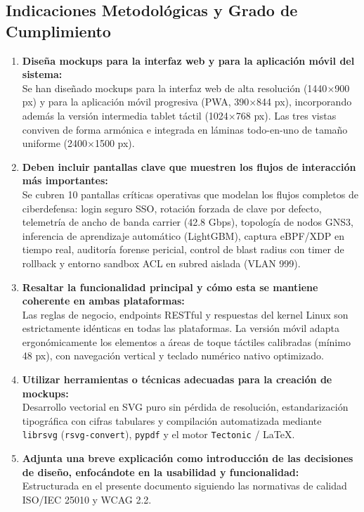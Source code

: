 \documentclass[11pt,a4paper]{article}
\begin{document}
\subsection{Indicaciones Metodológicas y Grado de Cumplimiento}
\begin{enumerate}[leftmargin=18bp, itemsep=4bp]
    \item \textbf{Diseña mockups para la interfaz web y para la aplicación móvil del sistema:}\\
    Se han diseñado mockups para la interfaz web de alta resolución (1440$\times$900 px) y para la aplicación móvil progresiva (PWA, 390$\times$844 px), incorporando además la versión intermedia tablet táctil (1024$\times$768 px). Las tres vistas conviven de forma armónica e integrada en láminas todo-en-uno de tamaño uniforme (2400$\times$1500 px).
    
    \item \textbf{Deben incluir pantallas clave que muestren los flujos de interacción más importantes:}\\
    Se cubren 10 pantallas críticas operativas que modelan los flujos completos de ciberdefensa: login seguro SSO, rotación forzada de clave por defecto, telemetría de ancho de banda carrier (42.8 Gbps), topología de nodos GNS3, inferencia de aprendizaje automático (LightGBM), captura eBPF/XDP en tiempo real, auditoría forense pericial, control de blast radius con timer de rollback y entorno sandbox ACL en subred aislada (VLAN 999).
    
    \item \textbf{Resaltar la funcionalidad principal y cómo esta se mantiene coherente en ambas plataformas:}\\
    Las reglas de negocio, endpoints RESTful y respuestas del kernel Linux son estrictamente idénticas en todas las plataformas. La versión móvil adapta ergonómicamente los elementos a áreas de toque táctiles calibradas (mínimo 48 px), con navegación vertical y teclado numérico nativo optimizado.
    
    \item \textbf{Utilizar herramientas o técnicas adecuadas para la creación de mockups:}\\
    Desarrollo vectorial en SVG puro sin pérdida de resolución, estandarización tipográfica con cifras tabulares y compilación automatizada mediante \texttt{librsvg} (\texttt{rsvg-convert}), \texttt{pypdf} y el motor \texttt{Tectonic} / \LaTeX.
    
    \item \textbf{Adjunta una breve explicación como introducción de las decisiones de diseño, enfocándote en la usabilidad y funcionalidad:}\\
    Estructurada en el presente documento siguiendo las normativas de calidad ISO/IEC 25010 y WCAG 2.2.
\end{enumerate}
\end{document}
